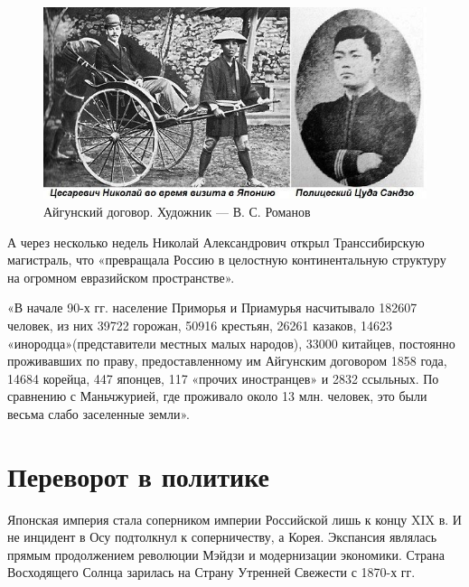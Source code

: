 \begin{figure}[h!tb] 
	\centering\includegraphics[scale=0.5]{Data/RYAV_predposylki/_d-EZ1r9Apk.jpg}
	\caption{Айгунский договор. Художник — В. С. Романов
	}%
\end{figure}

А через несколько недель Николай Александрович открыл Транссибирскую магистраль, что «превращала Россию в целостную континентальную структуру на огромном евразийском пространстве».
\begin{textcitation} 
«В начале 90-х гг. население Приморья и Приамурья насчитывало 182607 человек, из них 39722 горожан, 50916 крестьян, 26261 казаков, 14623 «инородца»(представители местных малых народов), 33000 китайцев, постоянно проживавших по праву, предоставленному им Айгунским договором 1858 года, 14684 корейца, 447 японцев, 117 «прочих иностранцев» и 2832 ссыльных. По сравнению с Маньчжурией, где проживало около 13 млн. человек, это были весьма слабо заселенные земли».
\end{textcitation}

\section{ Переворот в политике}

Японская империя стала соперником империи Российской лишь к концу XIX в. И не инцидент в Осу подтолкнул к соперничеству, а Корея. Экспансия являлась прямым продолжением революции Мэйдзи и модернизации экономики. Страна Восходящего Солнца зарилась на Страну Утренней Свежести с 1870-х гг.

